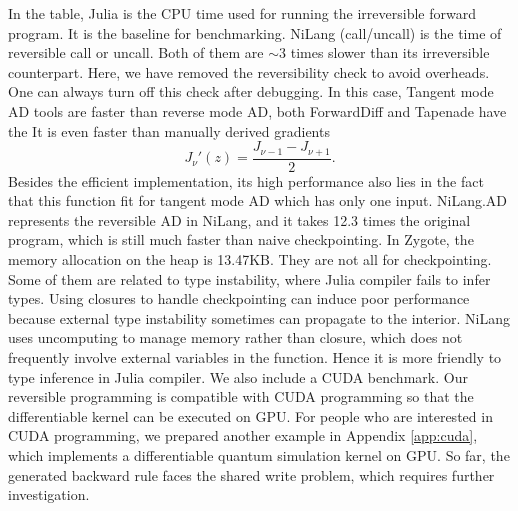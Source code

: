 \documentclass{article}
\newcommand{\<}{\langle}
\renewcommand{\>}{\rangle}
\newcommand{\App}[1]{Appendix \ref{#1}}
\newcommand{\blue}[1]{[{\bf  \color{blue}{JG: #1}}]}
\theoremstyle{definition}\newtheorem{definition}{\textit{Definition}}
\begin{document}
In the table, Julia is the CPU time used for running the irreversible forward program. It is the baseline for benchmarking.
NiLang (call/uncall) is the time of reversible call or uncall. Both of them are $\sim 3$ times slower than its irreversible counterpart. Here, we have removed the reversibility check to avoid overheads. One can always turn off this check after debugging.
In this case, Tangent mode AD tools are faster than reverse mode AD, both ForwardDiff and Tapenade have the 
It is even faster than manually derived gradients
\begin{equation}
    J_{\nu}'(z) = \frac{J_{\nu-1} - J_{\nu+1}}{2}.
\end{equation}
Besides the efficient implementation, its high performance also lies in the fact that this function fit for tangent mode AD which has only one input.
NiLang.AD represents the reversible AD in NiLang, and it takes 12.3 times the original program, which is still much faster than naive checkpointing.
In Zygote, the memory allocation on the heap is 13.47KB. They are not all for checkpointing. Some of them are related to type instability, where Julia compiler fails to infer types.
Using closures to handle checkpointing can induce poor performance because external type instability sometimes can propagate to the interior.
NiLang uses uncomputing to manage memory rather than closure, which does not frequently involve external variables in the function.
Hence it is more friendly to type inference in Julia compiler.
We also include a CUDA benchmark. Our reversible programming is compatible with CUDA programming so that the differentiable kernel can be executed on GPU.
For people who are interested in CUDA programming, we prepared another example in \App{app:cuda}, which implements a differentiable quantum simulation kernel on GPU.
So far, the generated backward rule faces the shared write problem, which requires further investigation.
\end{document}
